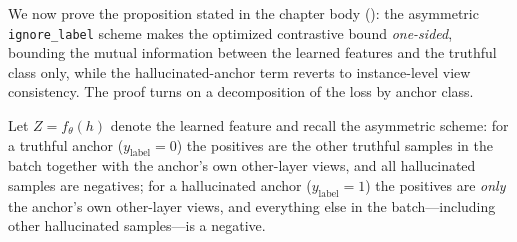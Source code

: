 We now prove the proposition stated in the chapter body
(): the asymmetric \texttt{ignore\_label} scheme makes
the optimized contrastive bound \emph{one-sided}, bounding the mutual information
between the learned features and the truthful class only, while the
hallucinated-anchor term reverts to instance-level view consistency. The proof
turns on a decomposition of the loss by anchor class.

Let $Z = f_\theta(h)$ denote the learned feature and recall the asymmetric
scheme: for a truthful anchor ($y_{\mathrm{label}}=0$) the positives are the
other truthful samples in the batch together with the anchor's own other-layer
views, and all hallucinated samples are negatives; for a hallucinated anchor
($y_{\mathrm{label}}=1$) the positives are \emph{only} the anchor's own
other-layer views, and everything else in the batch---including other
hallucinated samples---is a negative.

